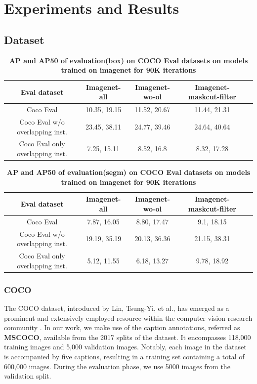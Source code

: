 \chapter{Experiments and Results}\label{chap:experiments}
\section{Dataset}
\cite{wang2023cut}
\begin{table}[htbp]
	\centering
	\begin{tabular}{c|c|c|cl}
		\toprule
		Eval dataset & Imagenet-all & Imagenet-wo-ol & Imagenet-maskcut-filter \\
		\midrule
		Coco Eval & 10.35, 19.15 & 11.52, 20.67 & 11.44, 21.31 \\
		\midrule
		Coco Eval w/o overlapping inst. & 23.45, 38.11  & 24.77, 39.46 & 24.64, 40.64 \\
		\midrule
		Coco Eval only overlapping inst. & 7.25, 15.11 & 8.52, 16.8 & 8.32, 17.28 \\
		\bottomrule
	\end{tabular}
	\caption{\textbf{AP and AP50 of evaluation(box) on COCO Eval datasets on models trained on imagenet for 90K iterations}}
	\label{tab:ablationK}
\end{table}

\begin{table}[htbp]
	\centering
	\begin{tabular}{c|c|c|cl}
		\toprule
		Eval dataset & Imagenet-all & Imagenet-wo-ol & Imagenet-maskcut-filter \\
		\midrule
		Coco Eval & 7.87, 16.05 & 8.80, 17.47 & 9.1, 18.15 \\
		\midrule
		Coco Eval w/o overlapping inst. & 19.19, 35.19  & 20.13, 36.36 & 21.15, 38.31 \\
		\midrule
		Coco Eval only overlapping inst. & 5.12, 11.55 & 6.18, 13.27 & 9.78, 18.92 \\
		\bottomrule
	\end{tabular}
	\caption{\textbf{AP and AP50 of evaluation(segm) on COCO Eval datasets on models trained on imagenet for 90K iterations}}
	\label{tab:ablationK}
\end{table}

\subsection{COCO}
The COCO dataset, introduced by Lin, Tsung-Yi, et al., has emerged as a prominent and extensively employed resource within the computer vision research community \cite{chen2015microsoft}. In our work, we make use of the caption annotations, referred as \textbf{MSCOCO}, available from the 2017 splits of the dataset. It encompasses 118,000 training images and 5,000 validation images. Notably, each image in the dataset is accompanied by five captions, resulting in a training set containing a total of 600,000 images. During the evaluation phase, we use 5000 images from the validation split.

